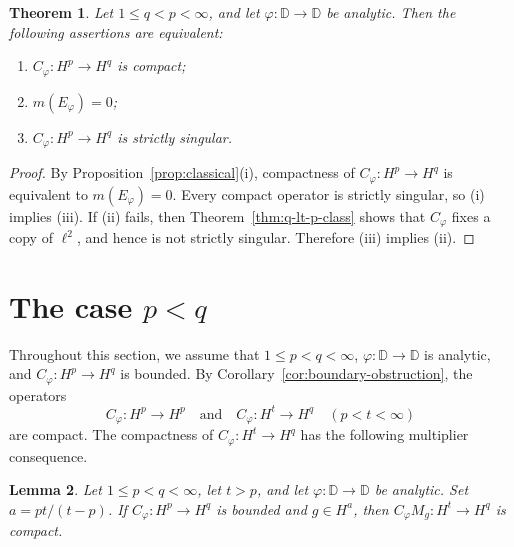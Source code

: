\documentclass[10pt,a4paper]{amsart}
\newtheorem{theorem}{Theorem}[section]
\newtheorem{lemma}[theorem]{Lemma}
\newcommand{\D}{\mathbb{D}}
\begin{document}
\begin{theorem}
\label{thm:q-lt-p-identity}
Let \(1\le q<p<\infty\), and let \(\varphi:\D\to\D\) be analytic.
Then the following assertions are equivalent:
\begin{enumerate}[label=\textup{(\roman*)}]
\item \(C_\varphi:H^p\to H^q\) is compact;
\item \(m(E_\varphi)=0\);
\item \(C_\varphi:H^p\to H^q\) is strictly singular.
\end{enumerate}
\end{theorem}

\begin{proof}
By
Proposition~\ref{prop:classical}\textup{(i)},
compactness of \(C_\varphi:H^p\to H^q\) is equivalent to
\(m(E_\varphi)=0\). Every compact operator is strictly singular, so
\textup{(i)} implies \textup{(iii)}. If \textup{(ii)} fails, then
Theorem~\ref{thm:q-lt-p-class} shows that
\(C_\varphi\) fixes a copy of \(\ell^2\), and hence is not strictly
singular. Therefore \textup{(iii)} implies \textup{(ii)}.
\end{proof} \smallskip 



\section{\texorpdfstring{The case \(p<q\)}
{The case p < q}}
\label{sec:p-lt-q}


Throughout this section, we assume that \(1\le p<q<\infty\), \(\varphi:\D\to\D\) is analytic, and \(C_\varphi:H^p\to H^q\) is bounded. By
Corollary~\ref{cor:boundary-obstruction}, the operators
\[
        C_\varphi:H^p\to H^p
        \quad\text{and}\quad
        C_\varphi:H^t\to H^q
        \quad (p<t<\infty)
\]
are compact. The compactness of \(C_\varphi:H^t\to H^q\) has the
following multiplier consequence.

\begin{lemma}
\label{lem:mult-compact}
Let \(1\le p<q<\infty\), let \(t>p\), and let
\(\varphi:\D\to\D\) be analytic. Set
\(a=pt/(t-p)\).
If \(C_\varphi:H^p\to H^q\) is bounded and \(g\in H^a\), then
\(C_\varphi M_g:H^t\to H^q\) is compact.
\end{lemma}
\end{document}

